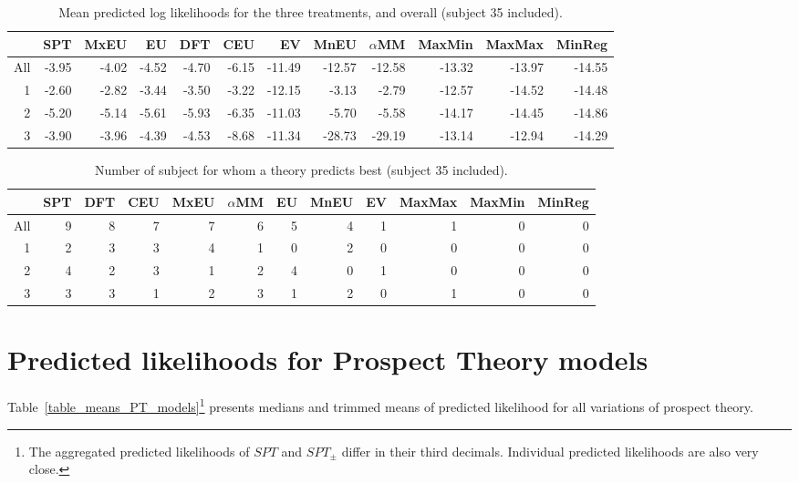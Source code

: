 \documentclass[11pt, a4paper, oneside,final,notitlepage,onecolumn]{article}\usepackage[]{graphicx}\usepackage[]{color}
\newcounter{sectio}
\begin{document}
\begin{table}[!htb]
\centering
\begin{tabular}{rrrrrrrrrrrr}
  \hline
 & SPT & MxEU & EU & DFT & CEU & EV & MnEU & $\alpha$MM & MaxMin & MaxMax & MinReg \\ 
  \hline
All & -3.95 & -4.02 & -4.52 & -4.70 & -6.15 & -11.49 & -12.57 & -12.58 & -13.32 & -13.97 & -14.55 \\ 
  1 & -2.60 & -2.82 & -3.44 & -3.50 & -3.22 & -12.15 & -3.13 & -2.79 & -12.57 & -14.52 & -14.48 \\ 
  2 & -5.20 & -5.14 & -5.61 & -5.93 & -6.35 & -11.03 & -5.70 & -5.58 & -14.17 & -14.45 & -14.86 \\ 
  3 & -3.90 & -3.96 & -4.39 & -4.53 & -8.68 & -11.34 & -28.73 & -29.19 & -13.14 & -12.94 & -14.29 \\ 
   \hline
\end{tabular}
\caption{Mean predicted log likelihoods for the three treatments, and overall (subject 35 included).} 
\label{table_A_mean_plike}
\end{table}
\begin{table}[!htb]
\centering
\begin{tabular}{rrrrrrrrrrrr}
  \hline
 & SPT & DFT & CEU & MxEU & $\alpha$MM & EU & MnEU & EV & MaxMax & MaxMin & MinReg \\ 
  \hline
All & 9 & 8 & 7 & 7 & 6 & 5 & 4 & 1 & 1 & 0 & 0 \\ 
  1 & 2 & 3 & 3 & 4 & 1 & 0 & 2 & 0 & 0 & 0 & 0 \\ 
  2 & 4 & 2 & 3 & 1 & 2 & 4 & 0 & 1 & 0 & 0 & 0 \\ 
  3 & 3 & 3 & 1 & 2 & 3 & 1 & 2 & 0 & 1 & 0 & 0 \\ 
   \hline
\end{tabular}
\caption{Number of subject for whom a theory predicts best (subject 35 included).} 
\label{table_A_winners_with_SPT}
\end{table}


\section{Predicted likelihoods for Prospect Theory models}
\label{sec:pred-likel-prosp}

Table~\ref{table_means_PT_models}\footnote{The aggregated predicted likelihoods of $SPT$ and $SPT_{\pm}$ differ in their third decimals.  Individual predicted likelihoods are also very close.} presents medians and trimmed means of predicted likelihood for all variations of prospect theory.
\end{document}
